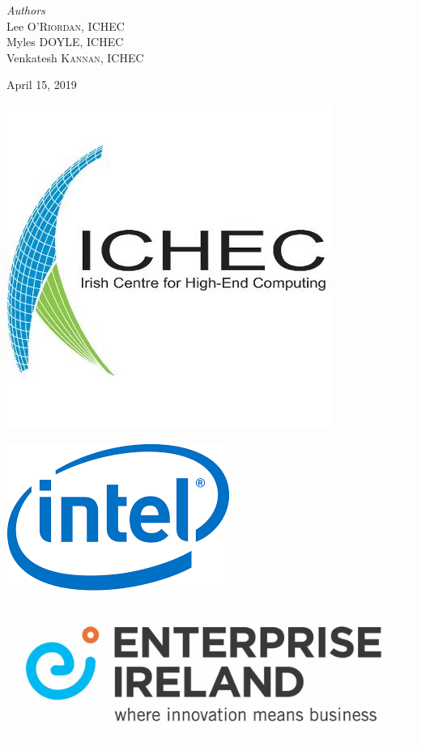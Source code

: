 \documentclass[11pt]{article}
\begin{document}
\begin{titlepage}
\vfill
\begin{center} \large
\emph{Authors}\\[0.5cm]
Lee \textsc{O'Riordan}, ICHEC\\[0.2cm]
Myles \textsc{DOYLE}, ICHEC\\[0.2cm]
Venkatesh \textsc{Kannan}, ICHEC
\end{center}
\vfill
{\large April 15, 2019}\\[1cm] 
\vfill
\hfill\begin{minipage}{0.4\textwidth}
\includegraphics[scale=0.3]{ichec_logo.jpeg}
\end{minipage}
\hfill
\begin{minipage}{0.4\textwidth}
\includegraphics[scale=0.4]{intel_logo.png}
\end{minipage}
\hfill
\vfill
\includegraphics[scale=0.3]{ei_logo.JPG}
\vfill
\end{titlepage}
\end{document}
